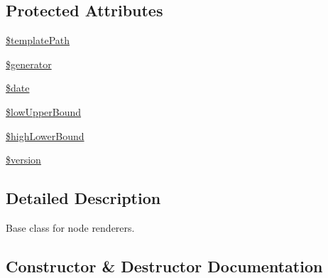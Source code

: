 \subsection*{Protected Attributes}
\begin{DoxyCompactItemize}
\item 
\mbox{\hyperlink{class_sebastian_bergmann_1_1_code_coverage_1_1_report_1_1_html_1_1_renderer_a719e40b65e19fd7c0bc1c2d971dd53ab}{\$template\+Path}}
\item 
\mbox{\hyperlink{class_sebastian_bergmann_1_1_code_coverage_1_1_report_1_1_html_1_1_renderer_ab328ac5b606185b5e1706aa41380cc76}{\$generator}}
\item 
\mbox{\hyperlink{class_sebastian_bergmann_1_1_code_coverage_1_1_report_1_1_html_1_1_renderer_a481c918f8d853749e00b5942cabf599a}{\$date}}
\item 
\mbox{\hyperlink{class_sebastian_bergmann_1_1_code_coverage_1_1_report_1_1_html_1_1_renderer_af6ef4b66e057d0ab575843e710014fbc}{\$low\+Upper\+Bound}}
\item 
\mbox{\hyperlink{class_sebastian_bergmann_1_1_code_coverage_1_1_report_1_1_html_1_1_renderer_ac74555c53f58b543ef1f072d97c0c459}{\$high\+Lower\+Bound}}
\item 
\mbox{\hyperlink{class_sebastian_bergmann_1_1_code_coverage_1_1_report_1_1_html_1_1_renderer_a17c8948c68aa44fa9961ae169b6a8961}{\$version}}
\end{DoxyCompactItemize}


\subsection{Detailed Description}
Base class for node renderers. 

\subsection{Constructor \& Destructor Documentation}
\mbox{\label{class_sebastian_bergmann_1_1_code_coverage_1_1_report_1_1_html_1_1_renderer_a51e93af278248ccd1d16725b156b0a36}} 
